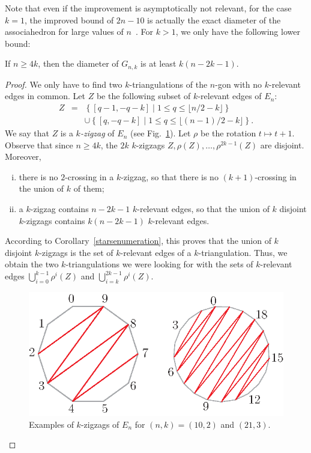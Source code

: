 \documentclass[12pt]{amsart}
\begin{document}
Note that even if the improvement is asymptotically not relevant, for the case $k=1$, the improved bound of $2n-10$ is actually the exact diameter of the associahedron for large values of $n$~\cite{stt-rdthg-88}. For $k>1$, we only have the following lower bound:

\begin{lemma}\label{diamin}
If $n\ge 4k$, then the diameter of $G_{n,k}$ is at least $k(n-2k-1)$.
\end{lemma}

\begin{proof}
We only have to find two $k$-triangulations of the $n$-gon with no $k$-relevant edges in common. Let $Z$ be the following subset of $k$-relevant edges of $E_n$:
\begin{eqnarray*}
Z & = & \left\{[q-1,-q-k]\;|\; 1\le q\le \lfloor n/2-k\rfloor\right\}\\
&&\cup\left\{[q,-q-k]\;|\; 1\le q\le \lfloor (n-1)/2-k\rfloor\right\}.
\end{eqnarray*}
We say that $Z$ is a \emph{$k$-zigzag} of $E_n$ (see Fig.~\ref{zigzags}). Let $\rho$ be the rotation $t\mapsto t+1$. Observe that since $n\ge 4k$, the $2k$ $k$-zigzags $Z,\rho(Z),\ldots,\rho^{2k-1}(Z)$ are disjoint. Moreover,
\begin{enumerate}[(i)]
\item there is no $2$-crossing in a $k$-zigzag, so that there is no $(k+1)$-crossing in the union of $k$ of them;
\item a $k$-zigzag contains $n-2k-1$ $k$-relevant edges, so that the union of $k$ disjoint $k$-zigzags contains $k(n-2k-1)$ $k$-relevant edges.
\end{enumerate}
According to Corollary~\ref{starsenumeration}, this proves that the union of $k$ disjoint $k$-zigzags is the set of $k$-relevant edges of a $k$-triangulation. Thus, we obtain the two $k$-triangulations we were looking for with the sets of $k$-relevant edges $\bigcup_{i=0}^{k-1} \rho^i(Z)$ and $\bigcup_{i=k}^{2k-1} \rho^i(Z)$.
\begin{figure}
\centerline{\includegraphics[scale=1]{zigzags.eps}}
\caption{\small{Examples of $k$-zigzags of $E_n$ for $(n,k)=(10,2)$ and $(21,3)$.}}\label{zigzags}
\end{figure}
\end{proof}
\end{document}
